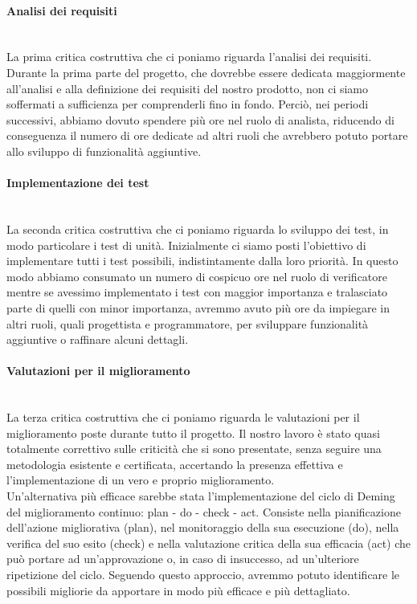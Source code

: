 		\paragraph*{Analisi dei requisiti} \mbox{} \\ [1mm]
		La prima critica costruttiva che ci poniamo riguarda l'analisi dei requisiti. Durante la prima parte del progetto\glo, che dovrebbe essere dedicata maggiormente all'analisi e alla definizione dei requisiti del nostro prodotto\glo, non ci siamo soffermati a sufficienza per comprenderli fino in fondo. Perciò, nei periodi successivi, abbiamo dovuto spendere più ore nel ruolo di analista, riducendo di conseguenza il numero di ore dedicate ad altri ruoli che avrebbero potuto portare allo sviluppo di funzionalità aggiuntive.
		\paragraph*{Implementazione dei test} \mbox{} \\ [1mm]
		La seconda critica costruttiva che ci poniamo riguarda lo sviluppo dei test, in modo particolare i test di unità. Inizialmente ci siamo posti l'obiettivo di implementare tutti i test possibili, indistintamente dalla loro priorità. In questo modo abbiamo consumato un numero di cospicuo ore nel ruolo di verificatore mentre se avessimo implementato i test con maggior importanza e tralasciato parte di quelli con minor importanza, avremmo avuto più ore da impiegare in altri ruoli, quali progettista e programmatore, per sviluppare funzionalità aggiuntive o raffinare alcuni dettagli.
		\paragraph*{Valutazioni per il miglioramento} \mbox{} \\ [1mm]
		La terza critica costruttiva che ci poniamo riguarda le valutazioni per il miglioramento poste durante tutto il progetto\glo. Il nostro lavoro è stato quasi totalmente correttivo sulle criticità che si sono presentate, senza seguire una metodologia esistente e certificata, accertando la presenza effettiva e l'implementazione di un vero e proprio miglioramento. \\
		Un'alternativa più efficace sarebbe stata l'implementazione del ciclo di Deming del miglioramento continuo: plan - do - check - act. Consiste nella pianificazione dell'azione migliorativa (plan), nel monitoraggio della sua esecuzione (do), nella verifica del suo esito (check) e nella valutazione critica della sua efficacia (act) che può portare ad un'approvazione o, in caso di insuccesso, ad un'ulteriore ripetizione del ciclo. Seguendo questo approccio, avremmo potuto identificare le possibili migliorie da apportare in modo più efficace e più dettagliato.
